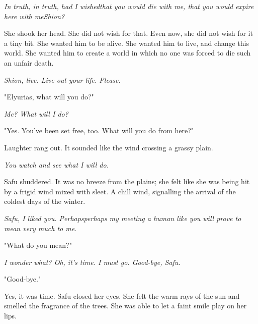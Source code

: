 \myspace

\emph{In truth, in truth, had I wished\el that you would die with me, that you
would expire here with me\el Shion?}

She shook her head. She did not wish for that. Even now, she did not
wish for it a tiny bit. She wanted him to be alive. She wanted him to
live, and change this world. She wanted him to create a world in which
no one was forced to die such an unfair death.

\emph{Shion, live. Live out your life. Please.}

"Elyurias, what will you do?"

\myspace

\emph{Me? What will I do\el ?}

\myspace

"Yes. You've been set free, too. What will you do from here?"

Laughter rang out. It sounded like the wind crossing a grassy plain.

\myspace

\emph{You watch and see what I will do.}

\myspace

Safu shuddered. It was no breeze from the plains; she felt like she was
being hit by a frigid wind mixed with sleet. A chill wind, signalling
the arrival of the coldest days of the winter.

\myspace

\emph{Safu, I liked you. Perhaps\el perhaps my meeting a human like you will
prove to mean very much to me.}

\myspace

"What do you mean?"

\myspace

\emph{I wonder what? Oh, it's time. I must go. Good-bye, Safu.}

\myspace

"Good-bye."

Yes, it was time. Safu closed her eyes. She felt the warm rays of the
sun and smelled the fragrance of the trees. She was able to let a faint
smile play on her lips.